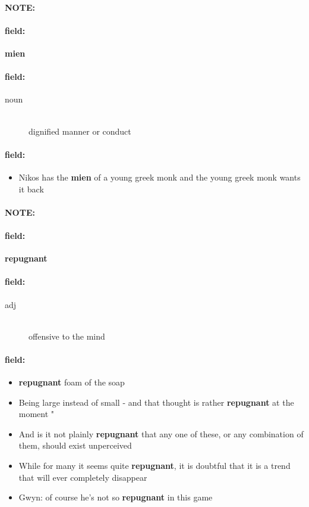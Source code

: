 \documentclass[12pt]{article}
\newenvironment{note}{\paragraph{NOTE:}}{}
\newenvironment{field}{\paragraph{field:}}{}
\begin{document}
\begin{note}
\begin{field}
\textbf{\large mien}
\end{field}


\begin{field}
\begin{description}
\item[noun] \hfill \\ 
dignified manner or conduct

\end{description}
\end{field}

\begin{field}
\begin{itemize}
\item Nikos has the \textbf{mien} of a young greek monk and the young greek monk wants it back
\end{itemize}
\end{field}
\end{note}
\begin{note}
\begin{field}
\textbf{\large repugnant}
\end{field}


\begin{field}
\begin{description}
\item[adj] \hfill \\ 
offensive to the mind

\end{description}
\end{field}

\begin{field}
\begin{itemize}
\item \textbf{repugnant} foam of the soap
\item Being large instead of small - and that thought is rather \textbf{repugnant} at the moment " 
\item And is it not plainly \textbf{repugnant} that any one of these, or any combination of them, should exist unperceived
\item While for many it seems quite \textbf{repugnant}, it is doubtful that it is a trend that will ever completely disappear
\item Gwyn: of course he's not so \textbf{repugnant} in this game
\end{itemize}
\end{field}
\end{note}
\end{document}
